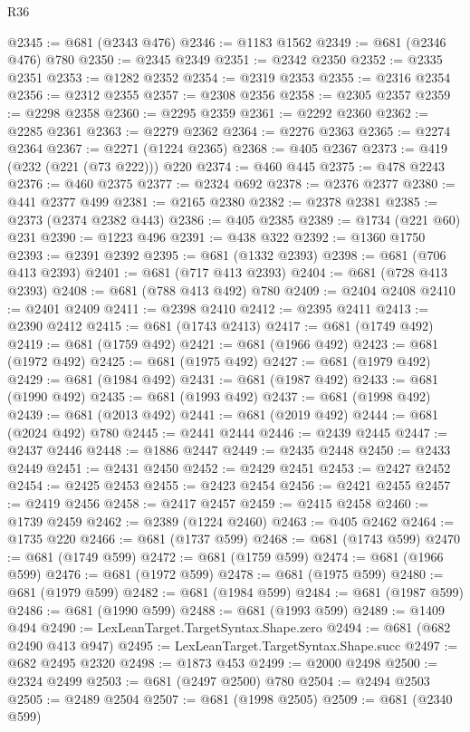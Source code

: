 \begin{lexlean}{R36}
\begin{coremodule}
@2345 := @681 (@2343 @476)
@2346 := @1183 @1562
@2349 := @681 (@2346 @476) @780
@2350 := @2345 @2349
@2351 := @2342 @2350
@2352 := @2335 @2351
@2353 := @1282 @2352
@2354 := @2319 @2353
@2355 := @2316 @2354
@2356 := @2312 @2355
@2357 := @2308 @2356
@2358 := @2305 @2357
@2359 := @2298 @2358
@2360 := @2295 @2359
@2361 := @2292 @2360
@2362 := @2285 @2361
@2363 := @2279 @2362
@2364 := @2276 @2363
@2365 := @2274 @2364
@2367 := @2271 (@1224 @2365)
@2368 := @405 @2367
@2373 := @419 (@232 (@221 (@73 @222))) @220
@2374 := @460 @445
@2375 := @478 @2243
@2376 := @460 @2375
@2377 := @2324 @692
@2378 := @2376 @2377
@2380 := @441 @2377 @499
@2381 := @2165 @2380
@2382 := @2378 @2381
@2385 := @2373 (@2374 @2382 @443)
@2386 := @405 @2385
@2389 := @1734 (@221 @60) @231
@2390 := @1223 @496
@2391 := @438 @322
@2392 := @1360 @1750
@2393 := @2391 @2392
@2395 := @681 (@1332 @2393)
@2398 := @681 (@706 @413 @2393)
@2401 := @681 (@717 @413 @2393)
@2404 := @681 (@728 @413 @2393)
@2408 := @681 (@788 @413 @492) @780
@2409 := @2404 @2408
@2410 := @2401 @2409
@2411 := @2398 @2410
@2412 := @2395 @2411
@2413 := @2390 @2412
@2415 := @681 (@1743 @2413)
@2417 := @681 (@1749 @492)
@2419 := @681 (@1759 @492)
@2421 := @681 (@1966 @492)
@2423 := @681 (@1972 @492)
@2425 := @681 (@1975 @492)
@2427 := @681 (@1979 @492)
@2429 := @681 (@1984 @492)
@2431 := @681 (@1987 @492)
@2433 := @681 (@1990 @492)
@2435 := @681 (@1993 @492)
@2437 := @681 (@1998 @492)
@2439 := @681 (@2013 @492)
@2441 := @681 (@2019 @492)
@2444 := @681 (@2024 @492) @780
@2445 := @2441 @2444
@2446 := @2439 @2445
@2447 := @2437 @2446
@2448 := @1886 @2447
@2449 := @2435 @2448
@2450 := @2433 @2449
@2451 := @2431 @2450
@2452 := @2429 @2451
@2453 := @2427 @2452
@2454 := @2425 @2453
@2455 := @2423 @2454
@2456 := @2421 @2455
@2457 := @2419 @2456
@2458 := @2417 @2457
@2459 := @2415 @2458
@2460 := @1739 @2459
@2462 := @2389 (@1224 @2460)
@2463 := @405 @2462
@2464 := @1735 @220
@2466 := @681 (@1737 @599)
@2468 := @681 (@1743 @599)
@2470 := @681 (@1749 @599)
@2472 := @681 (@1759 @599)
@2474 := @681 (@1966 @599)
@2476 := @681 (@1972 @599)
@2478 := @681 (@1975 @599)
@2480 := @681 (@1979 @599)
@2482 := @681 (@1984 @599)
@2484 := @681 (@1987 @599)
@2486 := @681 (@1990 @599)
@2488 := @681 (@1993 @599)
@2489 := @1409 @494
@2490 := LexLeanTarget.TargetSyntax.Shape.zero
@2494 := @681 (@682 @2490 @413 @947)
@2495 := LexLeanTarget.TargetSyntax.Shape.succ
@2497 := @682 @2495 @2320
@2498 := @1873 @453
@2499 := @2000 @2498
@2500 := @2324 @2499
@2503 := @681 (@2497 @2500) @780
@2504 := @2494 @2503
@2505 := @2489 @2504
@2507 := @681 (@1998 @2505)
@2509 := @681 (@2340 @599)

\end{coremodule}
\end{lexlean}

